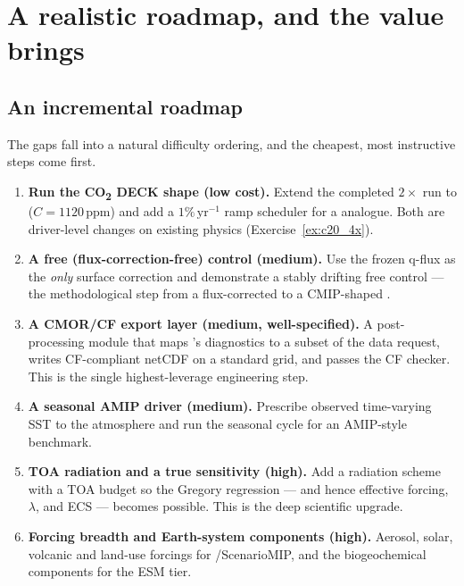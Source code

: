 \section{A realistic roadmap, and the value \model{} brings}\label{sec:c20_roadmap}

\subsection{An incremental roadmap}\label{sec:c20_steps}

The gaps fall into a natural difficulty ordering, and the cheapest, most
instructive steps come first.

\begin{enumerate}[leftmargin=2em]
\item \textbf{Run the CO\textsubscript{2} DECK shape (low cost).} Extend the
  completed $2\times$ run to  ($C=1120\,$ppm) and add a
  $1\%\,\mathrm{yr^{-1}}$ ramp scheduler for a  analogue. Both are
  driver-level changes on existing physics (Exercise~\ref{ex:c20_4x}).
\item \textbf{A free (flux-correction-free) control (medium).} Use the frozen
  q-flux as the \emph{only} surface correction and demonstrate a stably drifting
  free control --- the methodological step from a flux-corrected to a
  CMIP-shaped .
\item \textbf{A CMOR/CF export layer (medium, well-specified).} A post-processing
  module that maps \model{}'s diagnostics to a subset of the data request, writes
  CF-compliant netCDF on a standard grid, and passes the CF checker. This is the
  single highest-leverage engineering step.
\item \textbf{A seasonal AMIP driver (medium).} Prescribe observed time-varying SST
  to the \dino{} atmosphere and run the seasonal cycle for an AMIP-style benchmark.
\item \textbf{TOA radiation and a true sensitivity (high).} Add a radiation scheme
  with a TOA budget so the Gregory regression --- and hence effective forcing,
  $\lambda$, and ECS --- becomes possible. This is the deep scientific upgrade.
\item \textbf{Forcing breadth and Earth-system components (high).} Aerosol, solar,
  volcanic and land-use forcings for /ScenarioMIP, and the
  biogeochemical components for the ESM tier.
\end{enumerate}

